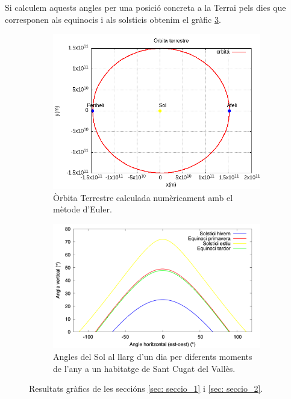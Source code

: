 \documentclass[11pt]{article}
\begin{document}
Si calculem aquests angles per una posició concreta a la Terrai pels dies que corresponen als equinocis i als solsticis obtenim el gràfic \ref{fig: solsticis}.
\begin{figure}[H]
    \centering
    \begin{subfigure}{0.4\textwidth}
        \centering
        \includegraphics[width=\textwidth]{orbita.png}
        \caption{Òrbita Terrestre calculada numèricament amb el mètode d'Euler.}
        \label{fig: orb_terra}
    \end{subfigure}
    \hspace{0.1\textwidth}
    \begin{subfigure}{0.4\textwidth}
        \centering
        \includegraphics[width=\textwidth]{equinocis.png}
        \caption{Angles del Sol al llarg d'un dia per diferents moments de l'any a un habitatge de Sant Cugat del Vallès.}
        \label{fig: solsticis}
    \end{subfigure}
\caption{Resultats gràfics de les seccións \ref{sec: seccio_1} i \ref{sec: seccio_2}.}
\end{figure}
\end{document}

